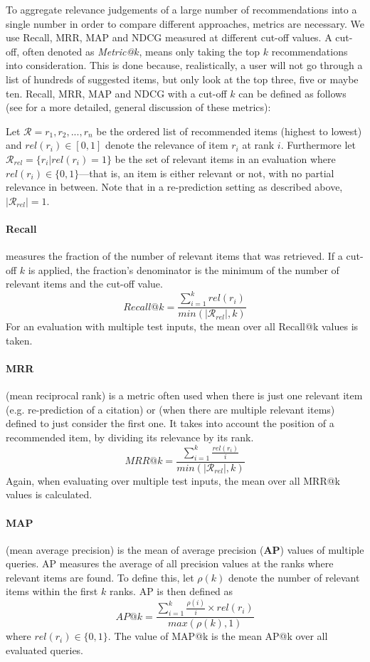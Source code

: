 To aggregate relevance judgements of a large number of recommendations into a single number in order to compare different approaches, metrics are necessary. We use Recall, MRR, MAP and NDCG measured at different cut-off values. A cut-off, often denoted as \emph{Metric@}$k$, means only taking the top $k$ recommendations into consideration. This is done because, realistically, a user will not go through a list of hundreds of suggested items, but only look at the top three, five or maybe ten. Recall, MRR, MAP and NDCG with a cut-off $k$ can be defined as follows (see \cite{Aggarwal2016} for a more detailed, general discussion of these metrics):

Let $\mathcal{R} = r_1,r_2, ..., r_n$ be the ordered list of recommended items (highest to lowest) and ${\mathit{rel}(r_i)\in[0, 1]}$ denote the relevance of item $r_i$ at rank $i$. Furthermore let ${\mathcal{R}_{rel}=\{r_i|\mathit{rel}(r_i)=1\}}$ be the set of relevant items in an evaluation where $\mathit{rel}(r_i)\in\{0,1\}$---that is, an item is either relevant or not, with no partial relevance in between. Note that in a re-prediction setting as described above, $|\mathcal{R}_{rel}|=1$.

\paragraph{Recall} measures the fraction of the number of relevant items that was retrieved. If a cut-off $k$ is applied, the fraction's denominator is the minimum of the number of relevant items and the cut-off value.\[ \mathit{Recall}@k = \frac{\sum\limits_{i=1}^{k} \mathit{rel}(r_i)}{\mathit{min}(|\mathcal{R}_{rel}|,k)} \] For an evaluation with multiple test inputs, the mean over all Recall@k values is taken.

\paragraph{MRR} (mean reciprocal rank) is a metric often used when there is just one relevant item (e.g. re-prediction of a citation) or (when there are multiple relevant items) defined to just consider the first one. It takes into account the position of a recommended item, by dividing its relevance by its rank.\[ \mathit{MRR}@k = \frac{\sum\limits_{i=1}^{k} \frac{\mathit{rel}(r_i)}{i}}{\mathit{min}(|\mathcal{R}_{rel}|,k)} \] Again, when evaluating over multiple test inputs, the mean over all MRR@k values is calculated.

\paragraph{MAP} (mean average precision) is the mean of average precision (\textbf{AP}) values of multiple queries. AP measures the average of all precision values at the ranks where relevant items are found. To define this, let $\rho(k)$ denote the number of relevant items within the first $k$ ranks. AP is then defined as \[ \mathit{AP}@k = \frac{\sum\limits_{i=1}^{k} \frac{\rho(i)}{i}\times\mathit{rel}(r_i)}{\mathit{max}(\rho(k), 1)} \] where $\mathit{rel}(r_i)\in\{0,1\}$. The value of MAP@k is the mean AP@k over all evaluated queries.

